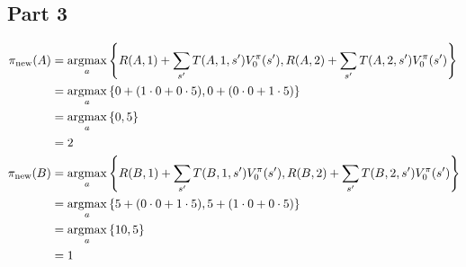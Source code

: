 \documentclass[12pt]{article}
\begin{document}
\subsection{Part 3}

\begin{align*}
    \pi_{\text{new}} (A) &= \operatorname*{arg max}_a \left \{ R(A, 1) + \sum_{s'} T(A, 1, s') V_0^\pi (s'), R(A, 2) + \sum_{s'} T(A, 2, s') V_0^\pi (s') \right \} \\
    &= \operatorname*{arg max}_a \left \{ 0 + (1 \cdot 0 + 0 \cdot 5), 0 + (0 \cdot 0 + 1 \cdot 5) \right \} \\
    &= \operatorname*{arg max}_a \left \{ 0, 5 \right \} \\
    &= 2 \\
    \pi_{\text{new}} (B) &= \operatorname*{arg max}_a \left \{ R(B, 1) + \sum_{s'} T(B, 1, s') V_0^\pi (s'), R(B, 2) + \sum_{s'} T(B, 2, s') V_0^\pi (s') \right \} \\
    &= \operatorname*{arg max}_a \left \{ 5 + (0 \cdot 0 + 1 \cdot 5), 5 + (1 \cdot 0 + 0 \cdot 5) \right \} \\
    &= \operatorname*{arg max}_a \left \{ 10, 5 \right \} \\
    &= 1 \\
\end{align*}
\end{document}
